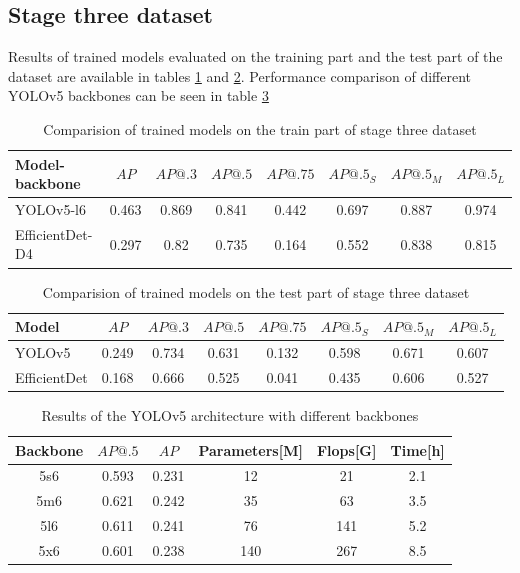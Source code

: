 \subsection{Stage three dataset}
Results of trained models evaluated on the training part and the test part of the dataset are available in tables \ref{tab:model_results:stage_three:train} and \ref{tab:model_results:stage_three:test}. Performance comparison of different YOLOv5 backbones can be seen in table \ref{tab:stage_three:yolov5_backbones}

\begin{table}[H]
    \centering
    \begin{tabular}{|l|c|c|c|c|c|c|c|}
        \hline
        Model-backbone  & $AP$  & $AP@.3$ & $AP@.5$ & $AP@.75$ & $AP@.5_S$ & $AP@.5_M$ & $AP@.5_L$ \\ \hline
        YOLOv5-l6       & 0.463 & 0.869   & 0.841   & 0.442    & 0.697     & 0.887     & 0.974     \\ \hline
        EfficientDet-D4 & 0.297 & 0.82    & 0.735   & 0.164    & 0.552     & 0.838     & 0.815     \\ \hline
    \end{tabular}
    \caption{Comparision of trained models on the train part of stage three dataset}
    \label{tab:model_results:stage_three:train}
\end{table}

\begin{table}[H]
    \centering
    \begin{tabular}{|l|c|c|c|c|c|c|c|}
        \hline
        Model        & $AP$  & $AP@.3$ & $AP@.5$ & $AP@.75$ & $AP@.5_S$ & $AP@.5_M$ & $AP@.5_L$ \\ \hline
        YOLOv5       & 0.249 & 0.734   & 0.631   & 0.132    & 0.598     & 0.671     & 0.607     \\ \hline
        EfficientDet & 0.168 & 0.666   & 0.525   & 0.041    & 0.435     & 0.606     & 0.527     \\ \hline
    \end{tabular}
    \caption{Comparision of trained models on the test part of stage three dataset}
    \label{tab:model_results:stage_three:test}
\end{table}

\begin{table}[H]
    \begin{tabular}{|c|c|c|c|c|c|}
        \hline
        Backbone & $AP@.5$ & $AP$  & Parameters[M] & Flops[G] & Time[h] \\ \hline
        5s6      & 0.593   & 0.231 & 12            & 21       & 2.1     \\ \hline
        5m6      & 0.621   & 0.242 & 35            & 63       & 3.5     \\ \hline
        5l6      & 0.611   & 0.241 & 76            & 141      & 5.2     \\ \hline
        5x6      & 0.601   & 0.238 & 140           & 267      & 8.5     \\ \hline
    \end{tabular}
    \caption{Results of the YOLOv5 architecture with different backbones}
    \label{tab:stage_three:yolov5_backbones}
\end{table}

